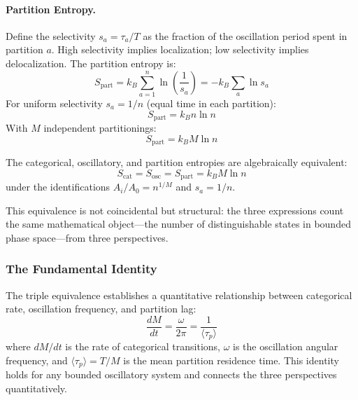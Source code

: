 \paragraph{Partition Entropy.}
Define the selectivity $s_a = \tau_a / T$ as the fraction of the oscillation period spent in partition $a$. High selectivity implies localization; low selectivity implies delocalization. The partition entropy is:
\begin{equation}
S_{\text{part}} = k_B \sum_{a=1}^{n} \ln\left(\frac{1}{s_a}\right) = -k_B \sum_a \ln s_a
\label{eq:partition_entropy}
\end{equation}
For uniform selectivity $s_a = 1/n$ (equal time in each partition):
\begin{equation}
S_{\text{part}} = k_B n \ln n
\end{equation}
With $M$ independent partitionings:
\begin{equation}
S_{\text{part}} = k_B M \ln n
\end{equation}

\begin{proposition}
\label{prop:entropy_equivalence}
The categorical, oscillatory, and partition entropies are algebraically equivalent:
\begin{equation}
S_{\text{cat}} = S_{\text{osc}} = S_{\text{part}} = k_B M \ln n
\end{equation}
under the identifications $A_i/A_0 = n^{1/M}$ and $s_a = 1/n$.
\end{proposition}

This equivalence is not coincidental but structural: the three expressions count the same mathematical object---the number of distinguishable states in bounded phase space---from three perspectives.

\subsubsection{The Fundamental Identity}

The triple equivalence establishes a quantitative relationship between categorical rate, oscillation frequency, and partition lag:
\begin{equation}
\frac{dM}{dt} = \frac{\omega}{2\pi} = \frac{1}{\langle\tau_p\rangle}
\label{eq:fundamental_gas}
\end{equation}
where $dM/dt$ is the rate of categorical transitions, $\omega$ is the oscillation angular frequency, and $\langle\tau_p\rangle = T/M$ is the mean partition residence time. This identity holds for any bounded oscillatory system and connects the three perspectives quantitatively.

